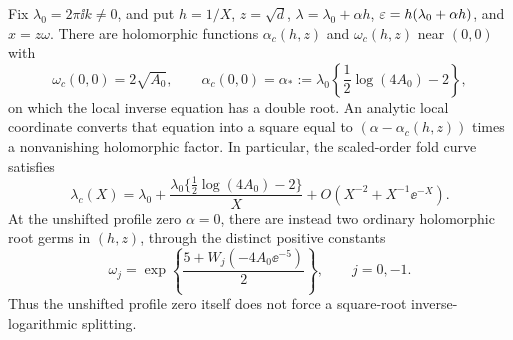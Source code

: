 \begin{theorem}\label{thm:local-complex-fold}
Fix $\lambda_0=2\pi\ii k\ne0$, and put
$h=1/X$, $z=\sqrt d$, $\lambda=\lambda_0+\alpha h$,
$\varepsilon=h(\lambda_0+\alpha h)$, and $x=z\omega$.
There are holomorphic functions $\alpha_c(h,z)$ and $\omega_c(h,z)$
near $(0,0)$ with
\begin{equation}\label{oc:complex-base}
 \omega_c(0,0)=2\sqrt{A_0},\qquad
 \alpha_c(0,0)=\alpha_*:=
 \lambda_0\left\{\frac12\log(4A_0)-2\right\},
\end{equation}
on which the local inverse equation has a double root.
An analytic local coordinate converts that equation into a square
equal to $(\alpha-\alpha_c(h,z))$ times a nonvanishing holomorphic
factor. In particular, the scaled-order fold curve satisfies
\begin{equation}\label{oc:complex-curve}
 \lambda_c(X)=\lambda_0+
 \frac{\lambda_0\{\frac12\log(4A_0)-2\}}{X}
       +O(X^{-2}+X^{-1}\ee^{-X}).
\end{equation}
At the unshifted profile zero $\alpha=0$, there are instead two
ordinary holomorphic root germs in $(h,z)$, through the distinct
positive constants
\begin{equation}\label{oc:complex-unshifted}
 \omega_j=\exp\left\{\frac{5+W_j(-4A_0\ee^{-5})}{2}\right\},
 \qquad j=0,-1.
\end{equation}
Thus the unshifted profile zero itself does not force a
square-root inverse-logarithmic splitting.
\end{theorem}

